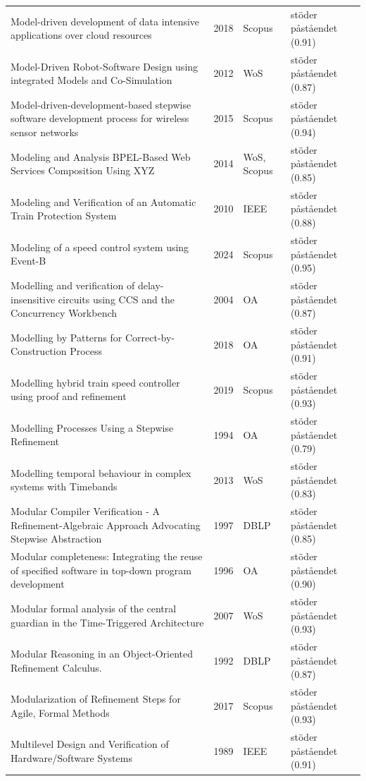 \begin{longtable}{@{}%
  >{\raggedright\arraybackslash}p{}c%
  >{\raggedright\arraybackslash}p{}%
  >{\raggedright\arraybackslash}p{}@{}}
Model-driven development of data intensive applications over cloud resources & 2018 & Scopus & stöder påståendet (0.91) \\
Model-Driven Robot-Software Design using integrated Models and Co-Simulation & 2012 & WoS & stöder påståendet (0.87) \\
Model-driven-development-based stepwise software development process for wireless sensor networks & 2015 & Scopus & stöder påståendet (0.94) \\
Modeling and Analysis BPEL-Based Web Services Composition Using XYZ & 2014 & WoS, Scopus & stöder påståendet (0.85) \\
Modeling and Verification of an Automatic Train Protection System & 2010 & IEEE & stöder påståendet (0.88) \\
Modeling of a speed control system using Event-B & 2024 & Scopus & stöder påståendet (0.95) \\
Modelling and verification of delay-insensitive circuits using CCS and the Concurrency Workbench & 2004 & OA & stöder påståendet (0.87) \\
Modelling by Patterns for Correct-by-Construction Process & 2018 & OA & stöder påståendet (0.91) \\
Modelling hybrid train speed controller using proof and refinement & 2019 & Scopus & stöder påståendet (0.93) \\
Modelling Processes Using a Stepwise Refinement & 1994 & OA & stöder påståendet (0.79) \\
Modelling temporal behaviour in complex systems with Timebands & 2013 & WoS & stöder påståendet (0.83) \\
Modular Compiler Verification - A Refinement-Algebraic Approach Advocating Stepwise Abstraction & 1997 & DBLP & stöder påståendet (0.85) \\
Modular completeness: Integrating the reuse of specified software in top-down program development & 1996 & OA & stöder påståendet (0.90) \\
Modular formal analysis of the central guardian in the Time-Triggered Architecture & 2007 & WoS & stöder påståendet (0.93) \\
Modular Reasoning in an Object-Oriented Refinement Calculus. & 1992 & DBLP & stöder påståendet (0.87) \\
Modularization of Refinement Steps for Agile, Formal Methods & 2017 & Scopus & stöder påståendet (0.93) \\
Multilevel Design and Verification of Hardware/Software Systems & 1989 & IEEE & stöder påståendet (0.91) \\

\end{longtable}
